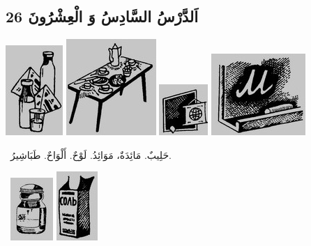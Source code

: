 \documentclass[a5paper]{article}
\begin{document}
\subsection{26 اَلدَّرْسُ السَّادِسُ وَ الْعِشْرُونَ}
 \includegraphics[width=0.8543in,height=1.3437in]{images/MuhammadBagauddinprettified-img050.jpg}   \includegraphics[width=1.3437in,height=1.4374in]{images/MuhammadBagauddinprettified-img051.jpg}   \includegraphics[width=0.7291in,height=0.7602in]{images/MuhammadBagauddinprettified-img052.jpg}   \includegraphics[width=1.4063in,height=1.2189in]{images/MuhammadBagauddinprettified-img053.jpg} 

\ حَلِيبٌ. مَائِدَةٌ، مَوَائِدُ. لَوْحٌ. أَلْوَاحٌ. طَبَاشِيرُ.

\  \includegraphics[width=0.6354in,height=0.9374in]{images/MuhammadBagauddinprettified-img054.jpg}   \includegraphics[width=0.6146in,height=1.0311in]{images/MuhammadBagauddinprettified-img055.jpg} 
\end{document}
